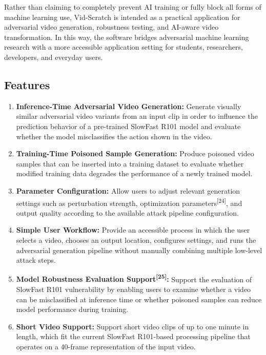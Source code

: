 Rather than claiming to completely prevent AI training or fully block all forms of machine learning use, Vid-Scratch is intended as a practical application for adversarial video generation, robustness testing, and AI-aware video transformation. In this way, the software bridges adversarial machine learning research with a more accessible application setting for students, researchers, developers, and everyday users.

\subsection{Features}
\label{subsection:features}

\begin{enumerate}[leftmargin=80pt]
    \item \textbf{Inference-Time Adversarial Video Generation:} Generate visually similar adversarial video variants from an input clip in order to influence the prediction behavior of a pre-trained SlowFast R101 model and evaluate whether the model misclassifies the action shown in the video.
    
    \item \textbf{Training-Time Poisoned Sample Generation:} Produce poisoned video samples that can be inserted into a training dataset to evaluate whether modified training data degrades the performance of a newly trained model.
    
    \item \textbf{Parameter Configuration:} Allow users to adjust relevant generation settings such as perturbation strength, optimization parameters\textsuperscript{[24]}, and output quality according to the available attack pipeline configuration.
    
    \item \textbf{Simple User Workflow:} Provide an accessible process in which the user selects a video, chooses an output location, configures settings, and runs the adversarial generation pipeline without manually combining multiple low-level attack steps.
    
    \item \textbf{Model Robustness Evaluation Support\textsuperscript{[25]}:} Support the evaluation of SlowFast R101 vulnerability by enabling users to examine whether a video can be misclassified at inference time or whether poisoned samples can reduce model performance during training.
    
    \item \textbf{Short Video Support:} Support short video clips of up to one minute in length, which fit the current SlowFast R101-based processing pipeline that operates on a 40-frame representation of the input video.
    

\end{enumerate}

